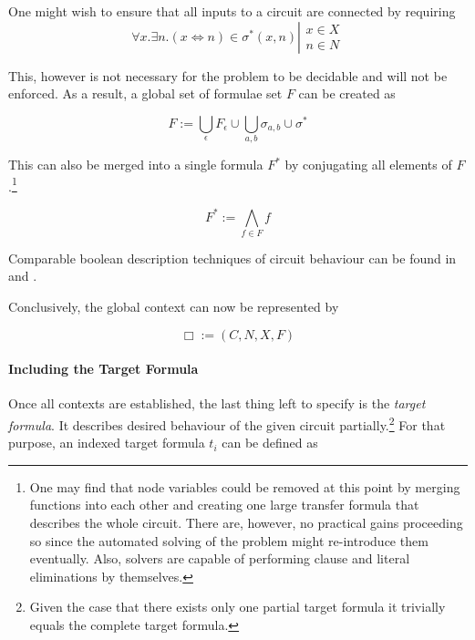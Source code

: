 	One might wish to ensure that all inputs to a circuit are connected by requiring
	\begin{equation}
		\forall x. \exists n.
		\left( 
			x \Leftrightarrow n
		\right) \in \sigma^*\left( x, n \right) 
	\left| 
	\begin{array}{l}
		x \in X \\
		n \in N
	\end{array}
	\right.
	\end{equation}		
	
	This, however is not necessary for the problem to be decidable and will not be enforced.
	As a result, a global set of formulae set $F$ can be created as
	
	\begin{equation}
		F := 
		\bigcup_{\epsilon} F_\epsilon \cup
		\bigcup_{a, b} \sigma_{a, b} \cup 
		\sigma^*
	\end{equation} 	
	
	This can also be merged into a single formula $F^*$ by conjugating all elements of $F$.\footnote{
		One may find that node variables could be removed at this point by merging functions into each other and creating one large transfer formula that describes the whole circuit.
		There are, however, no practical gains proceeding so since the automated solving of the problem might re-introduce them eventually.
		Also, solvers are capable of performing clause and literal eliminations by themselves.
	}	
	
	\begin{equation}
		F^* := \bigwedge_{f \in F} f
	\end{equation}	
	
	Comparable boolean description techniques of circuit behaviour can be found in \cite{EfficientSAT} and \cite{FPGA_PLB}.
	
	Conclusively, the global context can now be represented by 

	\begin{equation}
		\Box := \left(C, N, X, F \right)
		\label{eqn-define-box}
	\end{equation}	

	\paragraph{Including the Target Formula}
	Once all contexts are established, the last thing left to specify is the \emph{target formula}.
	It describes desired behaviour of the given circuit partially.\footnote{
		Given the case that there exists only one partial target formula it trivially equals the complete target formula.
	}
	For that purpose, an indexed target formula $t_i$ can be defined as  
	

